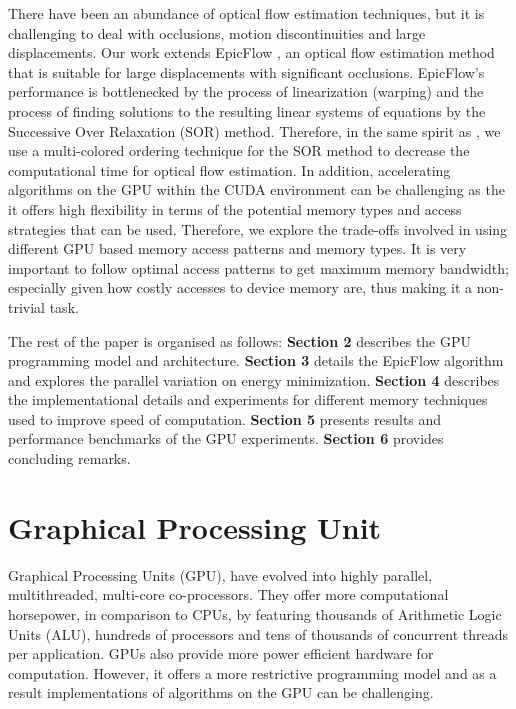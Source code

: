 \documentclass[english]{article}
\begin{document}
	There have been an abundance of optical flow estimation techniques, but it is challenging to deal with occlusions, motion discontinuities and large displacements. Our work extends EpicFlow \cite{1}, an optical flow estimation method that is suitable for large displacements with significant occlusions. EpicFlow's performance is bottlenecked by the process of linearization (warping) and the process of finding solutions to the resulting linear systems of equations by the Successive Over Relaxation (SOR) method. Therefore, in the same spirit as \cite{2}, we use a multi-colored ordering technique for the SOR method to decrease the computational time for optical flow estimation. In addition, accelerating algorithms on the GPU within the CUDA environment can be challenging as the it offers high flexibility in terms of the potential memory types and access strategies that can be used. Therefore, we explore the trade-offs involved in using different GPU based memory access patterns and memory types. It is very important to follow optimal access patterns to get maximum memory bandwidth; especially given how costly accesses to device memory are, thus making it a non-trivial task.\newline

	The rest of the paper is organised as follows: \textbf{Section 2} describes the GPU programming model and architecture. \textbf{Section 3} details the EpicFlow algorithm and explores the parallel variation on energy minimization. \textbf{Section 4} describes the implementational details and experiments for different memory techniques used to improve speed of computation. \textbf{Section 5} presents results and performance benchmarks of the GPU experiments. \textbf{Section 6} provides concluding remarks.
    
	\section{Graphical Processing Unit}
	Graphical Processing Units (GPU), have evolved into highly parallel, multithreaded, multi-core co-processors. They offer more computational horsepower, in comparison to CPUs, by featuring thousands of Arithmetic Logic Units (ALU), hundreds of processors and tens of thousands of concurrent threads per application. GPUs also provide more power efficient hardware for computation. However, it offers a more restrictive programming model and as a result implementations of algorithms on the GPU can be challenging.
\end{document}
